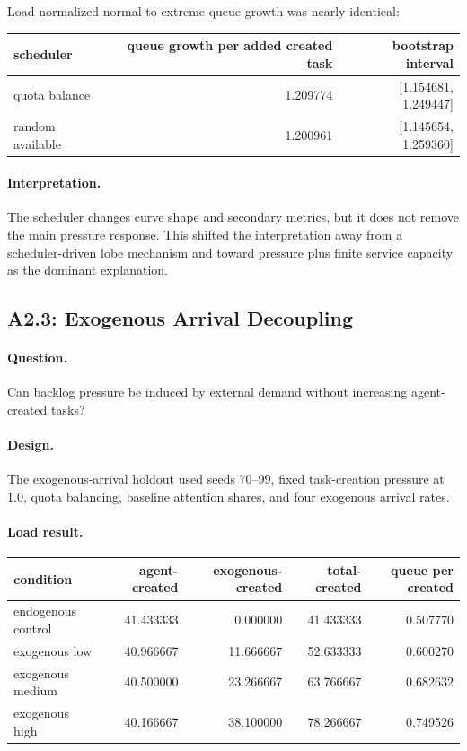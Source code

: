 \documentclass[11pt]{article}
\begin{document}
Load-normalized normal-to-extreme queue growth was nearly identical:

\begin{center}
\begin{tabular}{lrr}
scheduler & queue growth per added created task & bootstrap interval \\
\hline
quota balance & 1.209774 & [1.154681, 1.249447] \\
random available & 1.200961 & [1.145654, 1.259360]
\end{tabular}
\end{center}

\paragraph{Interpretation.}
The scheduler changes curve shape and secondary metrics, but it does not remove
the main pressure response. This shifted the interpretation away from a
scheduler-driven lobe mechanism and toward pressure plus finite service
capacity as the dominant explanation.

\subsection{A2.3: Exogenous Arrival Decoupling}

\paragraph{Question.}
Can backlog pressure be induced by external demand without increasing
agent-created tasks?

\paragraph{Design.}
The exogenous-arrival holdout used seeds 70--99, fixed task-creation pressure
at 1.0, quota balancing, baseline attention shares, and four exogenous arrival
rates.

\paragraph{Load result.}

\begin{center}
\begin{tabular}{lrrrr}
condition & agent-created & exogenous-created & total-created & queue per created \\
\hline
endogenous control & 41.433333 & 0.000000 & 41.433333 & 0.507770 \\
exogenous low & 40.966667 & 11.666667 & 52.633333 & 0.600270 \\
exogenous medium & 40.500000 & 23.266667 & 63.766667 & 0.682632 \\
exogenous high & 40.166667 & 38.100000 & 78.266667 & 0.749526
\end{tabular}
\end{center}
\end{document}
